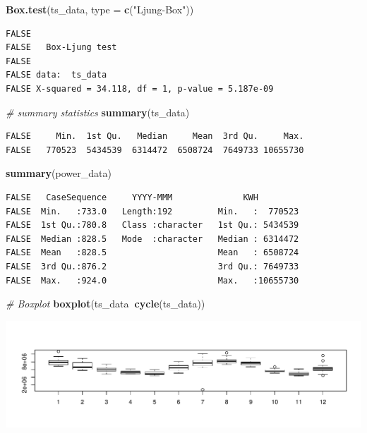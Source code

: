 \documentclass[openany]{book}
\newenvironment{Shaded}{\begin{snugshade}}{\end{snugshade}}
\newcommand{\CommentTok}[1]{\textcolor[rgb]{0.56,0.35,0.01}{\textit{#1}}}
\newcommand{\DataTypeTok}[1]{\textcolor[rgb]{0.13,0.29,0.53}{#1}}
\newcommand{\KeywordTok}[1]{\textcolor[rgb]{0.13,0.29,0.53}{\textbf{#1}}}
\newcommand{\NormalTok}[1]{#1}
\newcommand{\OperatorTok}[1]{\textcolor[rgb]{0.81,0.36,0.00}{\textbf{#1}}}
\newcommand{\StringTok}[1]{\textcolor[rgb]{0.31,0.60,0.02}{#1}}
\begin{document}
\begin{Shaded}
\begin{Highlighting}[]
\KeywordTok{Box.test}\NormalTok{(ts_data, }\DataTypeTok{type =} \KeywordTok{c}\NormalTok{(}\StringTok{"Ljung-Box"}\NormalTok{))}
\end{Highlighting}
\end{Shaded}

\begin{verbatim}
FALSE 
FALSE   Box-Ljung test
FALSE 
FALSE data:  ts_data
FALSE X-squared = 34.118, df = 1, p-value = 5.187e-09
\end{verbatim}

\begin{Shaded}
\begin{Highlighting}[]
\CommentTok{# summary statistics}
\KeywordTok{summary}\NormalTok{(ts_data)}
\end{Highlighting}
\end{Shaded}

\begin{verbatim}
FALSE     Min.  1st Qu.   Median     Mean  3rd Qu.     Max. 
FALSE   770523  5434539  6314472  6508724  7649733 10655730
\end{verbatim}

\begin{Shaded}
\begin{Highlighting}[]
\KeywordTok{summary}\NormalTok{(power_data)}
\end{Highlighting}
\end{Shaded}

\begin{verbatim}
FALSE   CaseSequence     YYYY-MMM              KWH          
FALSE  Min.   :733.0   Length:192         Min.   :  770523  
FALSE  1st Qu.:780.8   Class :character   1st Qu.: 5434539  
FALSE  Median :828.5   Mode  :character   Median : 6314472  
FALSE  Mean   :828.5                      Mean   : 6508724  
FALSE  3rd Qu.:876.2                      3rd Qu.: 7649733  
FALSE  Max.   :924.0                      Max.   :10655730
\end{verbatim}

\begin{Shaded}
\begin{Highlighting}[]
\CommentTok{# Boxplot}
\KeywordTok{boxplot}\NormalTok{(ts_data}\OperatorTok{~}\KeywordTok{cycle}\NormalTok{(ts_data))}
\end{Highlighting}
\end{Shaded}

\includegraphics{Part-B-AS_files/figure-latex/unnamed-chunk-3-6.pdf}
\end{document}
